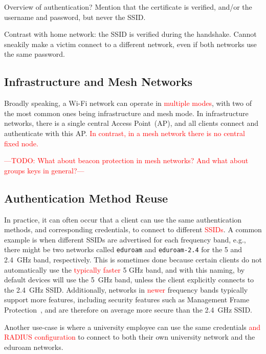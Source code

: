 \documentclass[sigconf,review]{acmart}
\newcommand{\wifi}{\mbox{Wi-Fi}}
\DeclareRobustCommand{\red}[1]{\textcolor{red}{#1}}
\begin{document}
Overview of authentication? Mention that the certificate is verified, and/or the username and password, but never the SSID.

Contrast with home network: the SSID is verified during the handshake.
Cannot sneakily make a victim connect to a different network, even if both networks use the same password.

\subsection{Infrastructure and Mesh Networks}

Broadly speaking, a \wifi{} network can operate in \red{multiple modes}, with two of the most common ones being infrastructure and mesh mode.
In infrastructure networks, there is a single central Access Point~(AP), and all clients connect and authenticate with this AP.
\red{In contrast, in a mesh network there is no central fixed node.}

\red{---TODO: What about beacon protection in mesh networks? And what about groups keys in general?---}

\subsection{Authentication Method Reuse}

In practice, it can often occur that a client can use the same authentication methods, and corresponding credentials, to connect to different \red{SSIDs}.
A common example is when different SSIDs are advertised for each frequency band, e.g., there might be two networks called \verb|eduroam| and \verb|eduroam-2.4| for the 5 and 2.4~GHz band, respectively.
This is sometimes done because certain clients do not automatically use the \red{typically faster} 5 GHz band, and with this naming, by default devices will use the 5~GHz band, unless the client explicitly connects to the 2.4~GHz SSID.
Additionally, networks in \red{newer} frequency bands typically support more features, including security features such as Management Frame Protection~\cite{schepers2021let}, and are therefore on average more secure than the 2.4~GHz SSID.

Another use-case is where a university employee can use the same credentials \red{and RADIUS configuration} to connect to both their own university network and the eduroam networks.
\end{document}
